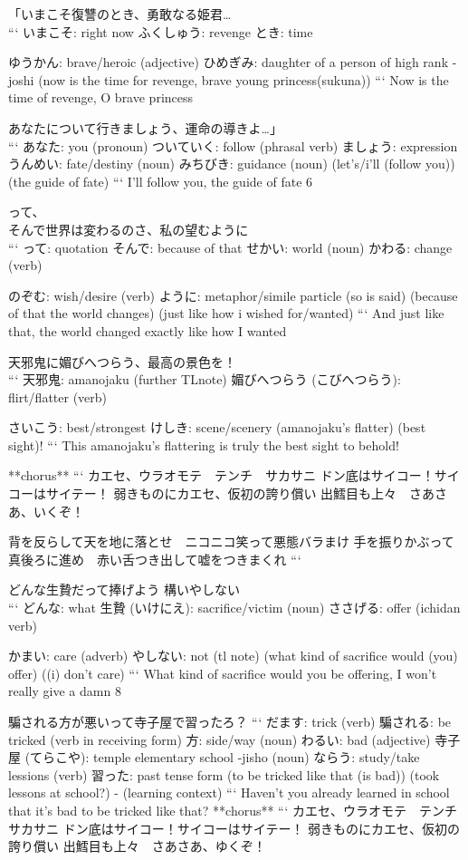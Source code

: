「いまこそ復讐のとき、勇敢なる姫君… \\
```
いまこそ: right now
ふくしゅう: revenge
とき: time

ゆうかん: brave/heroic (adjective)
ひめぎみ: daughter of a person of high rank -joshi
(now is the time for revenge, brave young princess(sukuna))
```
Now is the time of revenge, O brave princess

あなたについて行きましょう、運命の導きよ…」 \\
```
あなた: you (pronoun)
ついていく: follow (phrasal verb)
ましょう: expression
うんめい: fate/destiny (noun)
みちびき: guidance (noun)
(let's/i'll (follow you)) (the guide of fate)
```
I'll follow you, the guide of fate {6}

って、 \\
そんで世界は変わるのさ、私の望むように \\
```
って: quotation
そんで: because of that
せかい: world (noun)
かわる: change (verb)

のぞむ: wish/desire (verb)
ように: metaphor/simile particle
(so is said) (because of that the world changes) (just like how i wished for/wanted)
```
And just like that, the world changed exactly like how I wanted

天邪鬼に媚びへつらう、最高の景色を！ \\
```
天邪鬼: amanojaku (further TLnote)
媚びへつらう (こびへつらう): flirt/flatter (verb)

さいこう: best/strongest
けしき: scene/scenery
(amanojaku's flatter) (best sight)!
```
This amanojaku's flattering is truly the best sight to behold!

**chorus**
```
カエセ、ウラオモテ　テンチ　サカサニ
ドン底はサイコー！サイコーはサイテー！
弱きものにカエセ、仮初の誇り償い
出鱈目も上々　さあさあ、いくぞ！

背を反らして天を地に落とせ　ニコニコ笑って悪態バラまけ
手を振りかぶって真後ろに進め　赤い舌つき出して嘘をつきまくれ
```

どんな生贄だって捧げよう 構いやしない \\
```
どんな: what
  生贄 (いけにえ): sacrifice/victim (noun)
ささげる: offer (ichidan verb)

かまい: care (adverb)
やしない: not (tl note)
(what kind of sacrifice would (you) offer) ((i) don't care)
```
What kind of sacrifice would you be offering, I won't really give a damn {8}

騙される方が悪いって寺子屋で習ったろ？
```
だます: trick (verb)
騙される: be tricked (verb in receiving form)
方: side/way (noun)
わるい: bad (adjective)
寺子屋 (てらこや): temple elementary school -jisho (noun)
ならう: study/take lessions (verb)
習った: past tense form
(to be tricked like that (is bad)) (took lessons at school?) - (learning context)
```
Haven't you already learned in school that it's bad to be tricked like that?
**chorus**
```
カエセ、ウラオモテ　テンチ　サカサニ
ドン底はサイコー！サイコーはサイテー！
弱きものにカエセ、仮初の誇り償い
出鱈目も上々　さあさあ、ゆくぞ！

